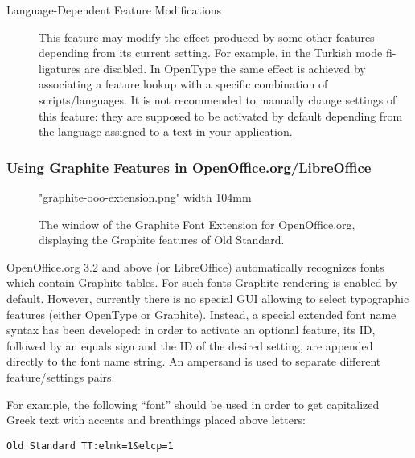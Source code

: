 \documentclass[12pt,a4paper,openany]{book}
\begin{document}
\begin{description}
\begin{table}[h!]
\begin{tabular}[c]
\end{tabular}
\end{table}

\item[Language-Dependent Feature Modifications] This feature may modify
the effect produced by some other features depending from its current
setting. For example, in the Turkish mode fi-ligatures are disabled. In
OpenType the same effect is achieved by associating a feature lookup
with a specific combination of scripts/languages. It is not recommended
to manually change settings of this feature: they are supposed to be
activated by default depending from the language assigned to a text in
your application.

\end{description}

\subsubsection{Using Graphite Features in OpenOffice.org/LibreOffice}

\begin{figure}[htb]

\centerline{\XeTeXpicfile "graphite-ooo-extension.png" width 104mm}

\caption{The window of the Graphite Font Extension for OpenOffice.org,
displaying the Graphite features of Old Standard.}

\hypertarget{fig:graphite-ext}{}\label{fig:graphite-ext}

\end{figure}

OpenOffice.org 3.2 and above (or LibreOffice) automatically recognizes
fonts which contain Graphite tables. For such fonts Graphite rendering
is enabled by default. However, currently there is no special GUI
allowing to select typographic features (either OpenType or Graphite).
Instead, a special extended font name syntax has been developed: in
order to activate an optional feature, its ID, followed by an equals
sign and the ID of the desired setting, are appended directly to the
font name string. An ampersand is used to separate different feature/settings
pairs.

For example, the following “font” should be used in order to get
capitalized Greek text with accents and breathings placed
above letters:

\begin{verbatim}
Old Standard TT:elmk=1&elcp=1
\end{verbatim}
\end{document}
